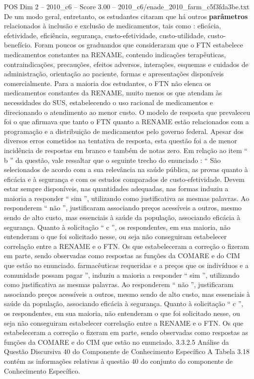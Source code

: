\begin{textsample}{POS Dim 2 – 2010\_c6 – Score 3.00 – 2010\_c6/enade\_2010\_farm\_c5f3fda3be.txt}
De um modo geral, entretanto, os estudantes citaram que há outros \textbf{parâmetros} relacionados à inclusão e exclusão de medicamentos, tais como : eficácia, efetividade, eficiência, segurança, custo-efetividade, custo-utilidade, custo-benefício.
Foram poucos os graduandos que consideraram que o FTN estabelece medicamentos constantes na RENAME, contendo indicações terapêuticas, contraindicações, precauções, efeitos adversos, interações, esquemas e cuidados de administração, orientação ao paciente, formas e apresentações disponíveis comercialmente.
Para a maioria dos estudantes, o FTN não elenca os medicamentos constantes da RENAME, muito menos os que atendam às necessidades do SUS, estabelecendo o uso racional de medicamentos e direcionando o atendimento ao menor custo.
O modelo de resposta que prevaleceu foi o que afirmava que tanto o FTN quanto a RENAME estão relacionados com a programação e a distribuição de medicamentos pelo governo federal.
Apesar dos diversos erros cometidos na tentativa de resposta, esta questão foi a de menor incidência de respostas em branco e também de notas zero.
Em relação ao item “ b ” da questão, vale ressaltar que o seguinte trecho do enunciado : “ São selecionados de acordo com a sua relevância na saúde pública, as provas quanto à eficácia e à segurança e com os estudos comparados de custo-efetividade.
Devem estar sempre disponíveis, nas quantidades adequadas, nas formas induziu a maioria a responder “ sim ”, utilizando como justificativa as mesmas palavras.
Ao responderem “ não ”, justificaram associando preços acessíveis a outros, mesmo sendo de alto custo, mas essenciais à saúde da população, associando eficácia à segurança.
Quanto à solicitação “ c ”, os respondentes, em sua maioria, não entenderam o que foi solicitado nesse, ou seja não conseguiram estabelecer correlação entre a RENAME e o FTN.
Os que estabeleceram a correção o fizeram em parte, sendo observadas como respostas as funções da COMARE e do CIM que estão no enunciado. farmacêuticas requeridas e a preços que os indivíduos e a comunidade possam pagar ”, induziu a maioria a responder “ sim ”, utilizando como justificativa as mesmas palavras.
Ao responderem “ não ”, justificaram associando preços acessíveis a outros, mesmo sendo de alto custo, mas essenciais à saúde da população, associando eficácia à segurança.
Quanto à solicitação “ c ”, os respondentes, em sua maioria, não entenderam o que foi solicitado nesse, ou seja não conseguiram estabelecer correlação entre a RENAME e o FTN.
Os que estabeleceram a correção o fizeram em parte, sendo observadas como respostas as funções da COMARE e do CIM que estão no enunciado. 3.3.2.5 Análise da Questão Discursiva 40 do Componente de Conhecimento Específico A Tabela 3.18 contém as informações relativas à questão 40 do conjunto do componente de Conhecimento Específico.

\end{textsample}
